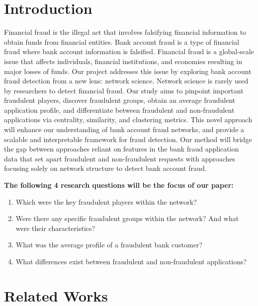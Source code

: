\documentclass{styles/svproc}
\begin{document}
\section{Introduction}
Financial fraud is the illegal act that involves falsifying financial information to obtain funds from financial entities. Bank account fraud is a type of financial fraud where bank account information is falsified. Financial fraud is a global-scale issue that affects individuals, financial institutions, and economies resulting in major losses of funds. Our project addresses this issue by exploring bank account fraud detection from a new lens: network science. Network science is rarely used by researchers to detect financial fraud. Our study aims to pinpoint important fraudulent players, discover fraudulent groups, obtain an average fraudulent application profile, and differentiate between fraudulent and non-fraudulent applications via centrality, similarity, and clustering metrics. This novel approach will enhance our understanding of bank account fraud networks, and provide a scalable and interpretable framework for fraud detection. Our method will bridge the gap between approaches reliant on features in the bank fraud application data that set apart fraudulent and non-fraudulent requests with approaches focusing solely on network structure to detect bank account fraud.

\bigskip
\noindent\textbf{The following 4 research questions will be the focus of our paper:}

\begin{enumerate}
  \item Which were the key fraudulent players within the network?
  \item Were there any specific fraudulent groups within the network? And what were their characteristics?
  \item What was the average profile of a fraudulent bank customer?
  \item What differences exist between fraudulent and non-fraudulent applications?
\end{enumerate}

\section{Related Works}
\end{document}
